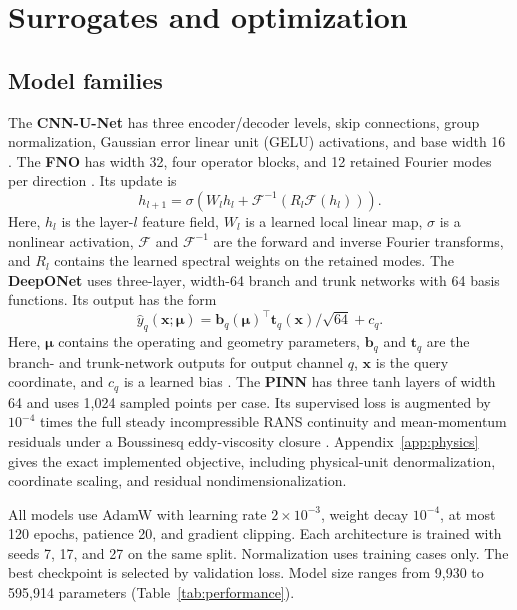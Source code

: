 \documentclass{article}
\begin{document}
\section{Surrogates and optimization}
\subsection{Model families}
The \textbf{CNN-U-Net} has three encoder/decoder levels, skip connections,
group normalization, Gaussian error linear unit (GELU) activations, and base
width 16 \citep{ronneberger2015unet}. The \textbf{FNO} has
width 32, four operator blocks, and 12 retained Fourier modes per direction
\citep{li2021fno}. Its update is
\begin{equation}
h_{l+1}=\sigma\!\left(W_lh_l+\mathcal{F}^{-1}(R_l\mathcal{F}(h_l))\right).
\end{equation}
Here, $h_l$ is the layer-$l$ feature field, $W_l$ is a learned local linear
map, $\sigma$ is a nonlinear activation, $\mathcal{F}$ and $\mathcal{F}^{-1}$
are the forward and inverse Fourier transforms, and $R_l$ contains the learned
spectral weights on the retained modes.
The \textbf{DeepONet} uses three-layer, width-64 branch and trunk networks with
64 basis functions. Its output has the form
\begin{equation}
\widehat y_q(\mathbf{x};\boldsymbol{\mu})=
\mathbf{b}_q(\boldsymbol{\mu})^\top\mathbf{t}_q(\mathbf{x})/\sqrt{64}+c_q.
\end{equation}
Here, $\boldsymbol{\mu}$ contains the operating and geometry parameters,
$\mathbf{b}_q$ and $\mathbf{t}_q$ are the branch- and trunk-network outputs for
output channel $q$, $\mathbf{x}$ is the query coordinate, and $c_q$ is a learned
bias \citep{lu2021deeponet}.
The \textbf{PINN} has three tanh layers of width 64 and uses 1,024 sampled
points per case. Its supervised loss is augmented by $10^{-4}$ times the full
steady incompressible RANS continuity and mean-momentum residuals under a
Boussinesq eddy-viscosity closure \citep{raissi2019pinn}. Appendix~\ref{app:physics}
gives the exact implemented objective, including physical-unit denormalization,
coordinate scaling, and residual nondimensionalization.

All models use AdamW with learning rate $2\times10^{-3}$, weight decay
$10^{-4}$, at most 120 epochs, patience 20, and gradient clipping. Each
architecture is trained with seeds 7, 17, and 27 on the same split.
Normalization uses training cases only. The best checkpoint is selected by
validation loss. Model size ranges from 9,930 to 595,914 parameters
(Table~\ref{tab:performance}).
\end{document}
